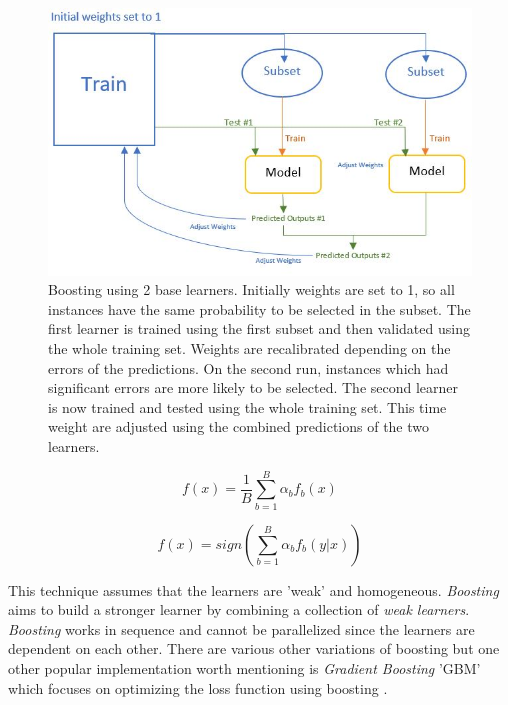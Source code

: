 \begin{figure}
  \includegraphics{graphics/ensemble_methods/boosting_example.JPG}
  \caption{
     Boosting using 2 base learners. Initially weights are set to 1, so all instances have the same probability to be selected in the subset. The first learner is trained using the first subset and then validated using the whole training set. Weights are recalibrated depending on the errors of the predictions. On the second run, instances which had significant errors are more likely to be selected. The second learner is now trained and tested using the whole training set. This time weight are adjusted using the combined predictions of the two learners.  
  }
  \label{fig:boostingexample}
\end{figure}

\begin{equation}\label{eq:boostinggmean}
    f(x) = \frac{1}{B} \sum_{b=1}^{B} \alpha_b f_b(x)
\end{equation}

\begin{equation}\label{eq:boostingvote}
    f(x) = sign (\sum_{b=1}^{B} \alpha_b f_b(y | x))
\end{equation}

This technique assumes that the learners are 'weak' and homogeneous. \textit{Boosting} aims to build a stronger learner by combining a collection of \textit{weak learners}. \textit{Boosting} works in sequence and cannot be parallelized since the learners are dependent on each other. There are various other variations of boosting but one other popular implementation worth mentioning is \textit{Gradient Boosting} 'GBM' which focuses on optimizing the loss function using boosting \citep{breiman1997arcing}. 

